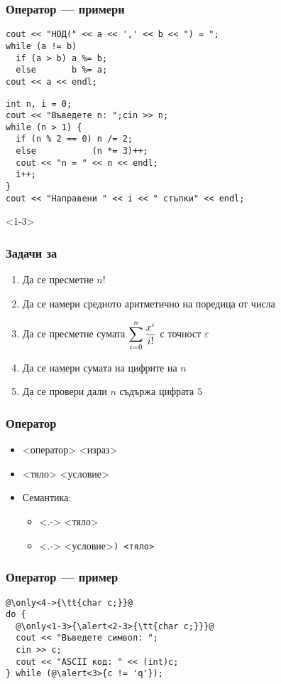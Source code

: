 \documentclass[alsotrans]{beamerswitch}
\newcommand{\expsum}{\displaystyle \sum_{i=0}^n \limits \frac{x^i}{i!}}
\begin{document}
\begin{frame}[fragile]
  \frametitle{Оператор  --- примери}

\begin{lstlisting}
cout << "НОД(" << a << ',' << b << ") = ";
while (a != b)
  if (a > b) a %= b;
  else       b %= a;
cout << a << endl;
\end{lstlisting}
\pause
\begin{lstlisting}
int n, i = 0;
cout << "Въведете n: ";cin >> n;
while (n > 1) {
  if (n % 2 == 0) n /= 2;
  else           (n *= 3)++;
  cout << "n = " << n << endl;
  i++;
}
cout << "Направени " << i << " стъпки" << endl;
\end{lstlisting}
\end{frame}

\begin{frame}<1-3>
  \frametitle{Задачи за }

  \begin{enumerate}[<+->]
  \item Да се пресметне $n!$
  \item Да се намери средното аритметично на поредица от числа
  \item Да се пресметне сумата $\expsum$ с точност $\varepsilon$
  \item Да се намери сумата на цифрите на $n$
  \item Да се провери дали $n$ съдържа цифрата $5$
  \end{enumerate}
\end{frame}

\begin{frame}
  \frametitle{Оператор }

  \begin{itemize}[<+->]
  \item {} <оператор> <израз>\tta{);}
  \item {} <тяло> <условие>\tta{);}
  \item Семантика:
    \begin{itemize}
    \item<.-> <тяло>
    \item<.-> <условие>\tt) <тяло>
    \end{itemize}
  \end{itemize}
\end{frame}

\begin{frame}
  \frametitle{Оператор  --- пример}

\begin{lstlisting}
@\only<4->{\tt{char c;}}@
do {
  @\only<1-3>{\alert<2-3>{\tt{char c;}}}@
  cout << "Въведете символ: ";
  cin >> c;
  cout << "ASCII код: " << (int)c;
} while (@\alert<3>{c != 'q'});
\end{lstlisting}
\end{frame}
\end{document}
